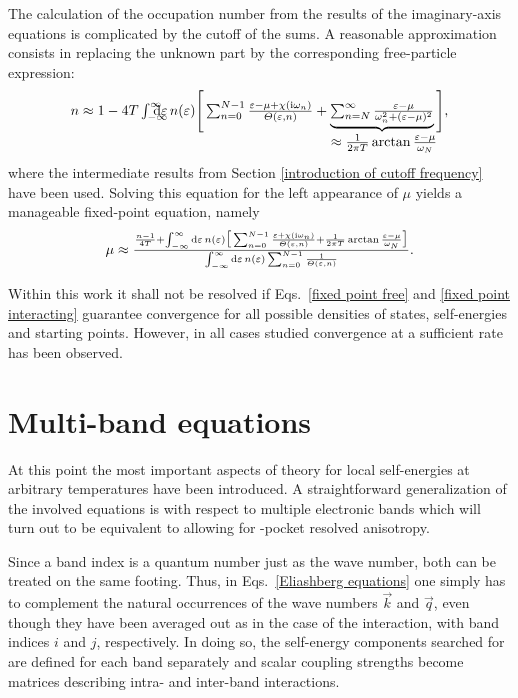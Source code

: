 The calculation of the occupation number from the results of the imaginary-axis
 equations is complicated by the cutoff of the 
sums. A reasonable approximation consists in replacing the unknown part by the
corresponding free-particle expression:
%
\begin{equation*}
    n \approx 1 - 4 T \int \from{-\infty} \till \infty \D \epsilon \,
    n(\epsilon)
    \Bigg[
        \sum_{n = 0}^{N - 1}
        \frac{\epsilon - \mu + \chi(\I \omega_n)}{\Theta(\epsilon, n)}
        + \hypo { \sum_{n = N}^\infty
            \frac{\epsilon - \mu}{\omega_n^2 + (\epsilon - \mu)^2} }
            {\approx \frac 1 {2 \pi T} \arctan \frac{\epsilon - \mu}{\omega_N}}
    \Bigg],
\end{equation*}
%
where the intermediate results from Section \ref{introduction of cutoff
frequency} have been used. Solving this equation for the left appearance of
$\mu$ yields a manageable fixed-point equation, namely
%
\begin{equation} \label{fixed point interacting}
    \mu \approx \frac
    {
        \frac{n - 1}{4 T} + \int_{-\infty}^\infty \D \epsilon \, n(\epsilon)
        \big[
            \sum_{n = 0}^{N - 1}
            \frac{\epsilon + \chi(\I \omega_n)}{\Theta(\epsilon, n)}
            + \frac 1 {2 \pi T} \arctan \frac{\epsilon - \mu}{\omega_N}
        \big]
    }
    {
        \int_{-\infty}^\infty \D \epsilon \, n(\epsilon)
        \sum_{n = 0}^{N - 1} \frac 1 {\Theta(\epsilon, n)}
    }.
\end{equation}

Within this work it shall not be resolved if Eqs.~\ref{fixed point free} and
\ref{fixed point interacting} guarantee convergence for all possible densities
of states, self-energies and starting points. However, in all cases studied
convergence at a sufficient rate has been observed.

\section{Multi-band equations}
\label{multi-band equations}

At this point the most important aspects of  theory for local
self-energies at arbitrary temperatures have been introduced. A straightforward
generalization of the involved equations is with respect to multiple electronic
bands which will turn out to be equivalent to allowing for -pocket
resolved anisotropy.

Since a band index is a quantum number just as the wave number, both can be
treated on the same footing. Thus, in Eqs.~\ref{Eliashberg equations} one simply
has to complement the natural occurrences of the wave numbers $\vec k$ and $\vec
q$, even though they have been averaged out as in the case of the 
interaction, with band indices $i$ and $j$, respectively. In doing so, the
self-energy components searched for are defined for each band separately and
scalar coupling strengths become matrices describing intra- and inter-band
interactions.


